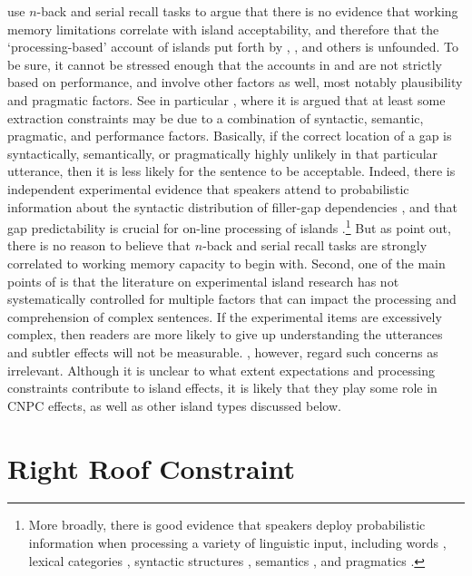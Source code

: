 \documentclass[output=paper
                ,modfonts
                ,nonflat
	        ,collection
	        ,collectionchapter
	        ,collectiontoclongg
 	        ,biblatex
                ,babelshorthands
                ,newtxmath
                ,draftmode
                ,colorlinks, citecolor=brown
]{./langsci/langscibook}
\begin{document}
  \citet{sprouse12} use $n$-back and serial recall tasks to argue that there is no evidence that working
  memory limitations correlate with island acceptability, and therefore that the `processing-based'
  account of islands put forth by  \citet{kluender92,kluender}, \citet{kluenderkustas}, \citet{hofsaglang} and others is unfounded. To be sure, it cannot be stressed enough that the accounts in \citet{kluender92} and \citet{hofsaglang} are  not strictly based on performance, and involve other factors as well, most notably plausibility and pragmatic factors. See in particular \citet[49]{hoflangreply}, where it is argued that at least some extraction constraints may be due to a combination of syntactic, semantic, pragmatic, and performance factors.  Basically, if the correct location of a gap is syntactically, semantically, or pragmatically highly unlikely in that particular utterance, then it is less likely for the sentence to be acceptable.  Indeed, there is independent experimental evidence that  speakers attend to  probabilistic information about the syntactic distribution of  filler-gap dependencies \citep{culcogsci},  and that gap  predictability  is crucial for on-line processing of islands \citep{michelt}.\footnote{More broadly, there is good  evidence that  speakers deploy probabilistic information when  processing a variety of linguistic input, including words \citep{altman99,arai,creel,delong,kutas84},  lexical categories \citep{gibson07,levy13,tabor97},  syntactic structures \citep{levyted,lau06,levy08,staub},  semantics \citep{altman99,federmeier,kamide03}, and pragmatics \citep{shankweiler,mak,roland12}.} But as \citet{reply2} point out, there is no reason to believe  that $n$-back and serial recall tasks are strongly correlated to working memory capacity to begin with. Second, one of the main points of \citet{hofsaglang} is that the literature  on experimental  island research has not systematically controlled for multiple factors that can impact the processing and comprehension of complex sentences. If the experimental items are excessively  complex, then readers are more likely to give up understanding the utterances and subtler effects  will not be measurable.  \citet{phil13}, however, regard such concerns as irrelevant.
    Although it is unclear to what extent expectations and processing constraints contribute to island effects, it is likely that they play some role in CNPC effects, as well as  other island types discussed below.


\section{Right Roof Constraint}
\end{document}
